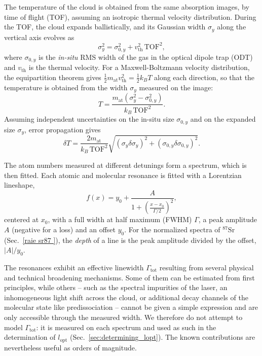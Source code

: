 The temperature of the cloud is obtained from the same absorption images, by time of flight
(TOF), assuming an isotropic thermal velocity distribution. During the TOF, the cloud expands
ballistically, and its Gaussian width $\sigma_y$ along the vertical axis evolves as
\begin{equation}
    \sigma_y^2 = \sigma_{0,y}^2 + v_{\text{th}}^2 \, \text{TOF}^2,
\end{equation}
where $\sigma_{0,y}$ is the \textit{in-situ} RMS width of the gas in the optical dipole trap
(ODT) and $v_{\text{th}}$ is the thermal velocity. For a Maxwell-Boltzmann velocity
distribution, the equipartition theorem gives $\frac{1}{2} m_{\text{at}} v_{\text{th}}^2 = \frac{1}{2} k_B T$
along each direction, so that the temperature is obtained from the width $\sigma_y$ measured on the image:
\begin{equation}
    T = \frac{m_{\text{at}} \left(\sigma_y^2 - \sigma_{0,y}^2\right)}{k_B \, \text{TOF}^2}.
\end{equation}
Assuming independent uncertainties on the in-situ size $\sigma_{0,y}$ and on the expanded size
$\sigma_y$, error propagation gives
\begin{equation}
    \delta T = \frac{2 m_{\text{at}}}{k_B \, \text{TOF}^2} \sqrt{\left(\sigma_y \delta \sigma_y\right)^2 + \left(\sigma_{0,y} \delta \sigma_{0,y}\right)^2}.
\label{eq:deltaT}
\end{equation}

The atom numbers measured at different detunings form a spectrum, which is then fitted.
Each atomic and molecular resonance is fitted with a Lorentzian lineshape,
\begin{equation}
    f(x) = y_0 + \frac{A}{1 + \left(\frac{x-x_0}{\Gamma/2}\right)^2},
    \label{eq:lorentzian_generic}
\end{equation}
centered at $x_0$, with a full width at half maximum (FWHM) $\Gamma$, a peak amplitude $A$
(negative for a loss) and an offset $y_0$. For the normalized spectra of $^{87}\text{Sr}$
(Sec.~\ref{raie sr87 }), the \textit{depth} of a line is the peak amplitude divided by the offset,
$|A|/y_0$.

The resonances exhibit an effective linewidth $\Gamma_{\text{tot}}$ resulting from
several physical and technical broadening mechanisms. Some of them can be
estimated from first principles, while others -- such as the spectral impurities
of the laser, an inhomogeneous light shift across the cloud, or additional decay
channels of the molecular state like predissociation -- cannot be given a simple
expression and are only accessible through the measured width. We therefore do
not attempt to model $\Gamma_{\text{tot}}$: it is measured on each spectrum and used
as such in the determination of $l_{\text{opt}}$ (Sec.~\ref{sec:determining_lopt}).
The known contributions are nevertheless useful as orders of magnitude.

